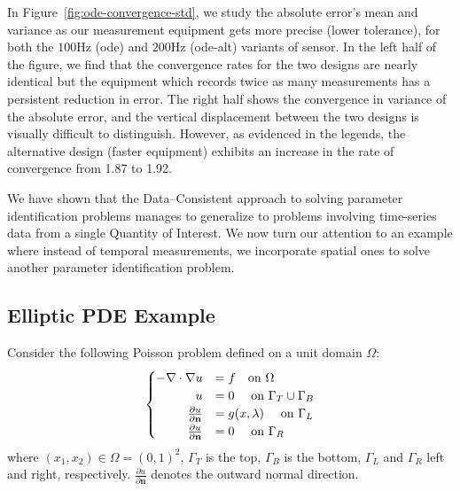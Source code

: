 In Figure~\ref{fig:ode-convergence-std}, we study the absolute error's mean and variance as our measurement equipment gets more precise (lower tolerance), for both the $100$Hz (ode) and $200$Hz (ode-alt) variants of sensor.
In the left half of the figure, we find that the convergence rates for the two designs are nearly identical but the equipment which records twice as many measurements has a persistent reduction in error.
The right half shows the convergence in variance of the absolute error, and the vertical displacement between the two designs is visually difficult to distinguish.
However, as evidenced in the legends, the alternative design (faster equipment) exhibits an increase in the rate of convergence from 1.87 to 1.92.

We have shown that the Data--Consistent approach to solving parameter identification problems manages to generalize to problems involving time-series data from a single Quantity of Interest.
We now turn our attention to an example where instead of temporal measurements, we incorporate spatial ones to solve another parameter identification problem.

\FloatBarrier
\subsection{Elliptic PDE Example}\label{subsec:pde-example}

Consider the following Poisson problem defined on a unit domain $\Omega$:
\begin{equation}\label{eq:pde-equation}
\begin{cases}
\hfill -\nabla \cdot \nabla u &= f \quad\text{on } \Omega \\
\hfill u &= 0 \quad\text{ on } \Gamma_T \cup \Gamma_B \\
\hfill \frac{\partial u}{\partial \mathbf{n}} &= g(x,\param) \quad\text{ on } \Gamma_L \\
\hfill \frac{\partial u}{\partial \mathbf{n}} &= 0 \quad\text{ on } \Gamma_R
\end{cases}
\end{equation}
where $(x_1, x_2) \in \Omega = (0,1)^2$, $\Gamma_T$ is the top, $\Gamma_B$ is the bottom, $\Gamma_L$ and $\Gamma_R$ left and right, respectively.
$\frac{\partial u}{\partial \mathbf{n}}$ denotes the outward normal direction.

